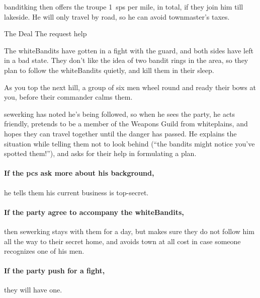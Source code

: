 
\Gls{banditking} then offers the troupe 1~\glspl{sp} per mile, in total, if they join him till \gls{lakeside}.
He will only travel by road, so he can avoid \gls{townmaster}'s taxes.

{The Deal}%
{The  request help}%

The \gls{whiteBandits} have gotten in a fight with the \gls{guard}, and both sides have left in a bad state.
They don't like the idea of two bandit rings in the area, so they plan to follow the \gls{whiteBandits} quietly, and kill them in their sleep.

\begin{boxtext}

  As you top the next hill, a group of six men wheel round and ready their bows at you, before their commander calms them.

\end{boxtext}

\Gls{sewerking} has noted he's being followed, so when he sees the party, he acts friendly, pretends to be a member of the Weapons Guild from \Gls{whiteplains}, and hopes they can travel together until the danger has passed.
He explains the situation while telling them not to look behind (``the bandits might notice you've spotted them!''), and asks for their help in formulating a plan.

\paragraph{If the \glspl{pc} ask more about his background,}
he tells them his current business is top-secret.


\sewerking


\paragraph{If the party agree to accompany the \gls{whiteBandits},}
then \gls{sewerking} stays with them for a day, but makes sure they do not follow him all the way to their secret home, and avoids town at all cost in case someone recognizes one of his men.

\paragraph{If the party push for a fight,}
they will have one.


